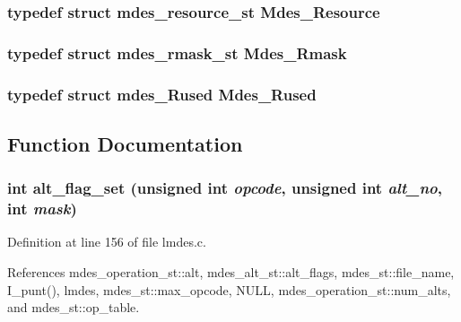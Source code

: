 \subsubsection{\setlength{\rightskip}{0pt plus 5cm}typedef struct \bf{mdes\_\-resource\_\-st}
 \bf{Mdes\_\-Resource}}\label{lmdes_8h_34745f34bf859432de674d86f42ec32a}


\subsubsection{\setlength{\rightskip}{0pt plus 5cm}typedef struct \bf{mdes\_\-rmask\_\-st}
 \bf{Mdes\_\-Rmask}}\label{lmdes_8h_01b9dc93e286b9da26feca2b34d88f3c}


\subsubsection{\setlength{\rightskip}{0pt plus 5cm}typedef struct \bf{mdes\_\-Rused}
 \bf{Mdes\_\-Rused}}\label{lmdes_8h_6e56c6218e6e640a592e163cf3d0edbb}




\subsection{Function Documentation}
\subsubsection{\setlength{\rightskip}{0pt plus 5cm}int alt\_\-flag\_\-set (unsigned int {\em opcode}, unsigned int {\em alt\_\-no}, int {\em mask})}\label{lmdes_8h_8170398096fe078ee847319d5f380200}




Definition at line 156 of file lmdes.c.

References mdes\_\-operation\_\-st::alt, mdes\_\-alt\_\-st::alt\_\-flags, mdes\_\-st::file\_\-name, I\_\-punt(), lmdes, mdes\_\-st::max\_\-opcode, NULL, mdes\_\-operation\_\-st::num\_\-alts, and mdes\_\-st::op\_\-table.
